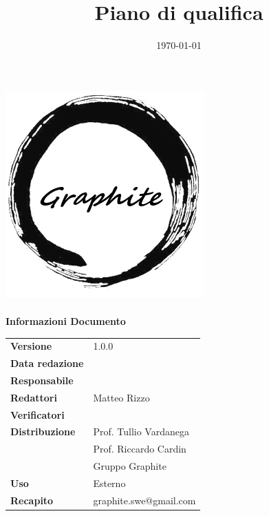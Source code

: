 \documentclass[openany,12pt,a4paper]{report}
\title{Piano di qualifica}
\author{}
\date{\today}
\begin{document}
	\makeatletter
	\begin{titlepage}
		\setlength{\headsep}{0pt}  
		\begin{center}
			\includegraphics[width=0.5\linewidth]{img/logo.png}\\[1em]
			{\huge \bfseries  \@title }\\[10ex]
			\textbf{\Large Informazioni Documento} \\[2em]
			\bgroup
			\def\arraystretch{1.5}
			\begin{tabular}{l|l}
				\textbf{Versione} & 1.0.0 \\
				\textbf{Data redazione} & \large \@date \\
				\textbf{Responsabile} & \\
				\textbf{Redattori} &  Matteo Rizzo \\
				\textbf{Verificatori} &  \\
				\textbf{Distribuzione} & Prof. Tullio Vardanega \\
				 & Prof. Riccardo Cardin \\
				 & Gruppo Graphite \\
				\textbf{Uso} & Esterno \\
				\textbf{Recapito} & graphite.swe@gmail.com \\
			\end{tabular}
		\egroup
		\end{center}
	\end{titlepage}
	\makeatother
 
\thispagestyle{empty}
\newpage

\tableofcontents


\begin{versionhistory}
	
	
\end{versionhistory}
\end{document}
